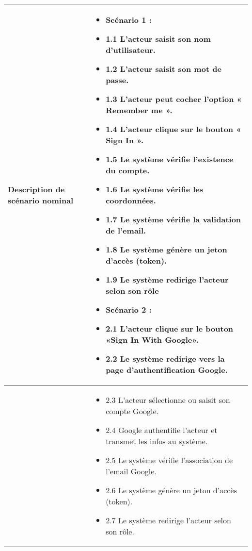 \begin{longtable}{|>{\arraybackslash}p{4.2cm}|>{\arraybackslash}p{12.5cm}|}
\textbf{Description de scénario nominal} &
\begin{itemize}[label=]
  \item \textbf{Scénario 1 :}
    \item 1.1 L'acteur saisit son nom d'utilisateur.
    \item 1.2 L'acteur saisit son mot de passe.
    \item 1.3 L'acteur peut cocher l'option « Remember me ».
    \item 1.4 L'acteur clique sur le bouton « Sign In ».
    \item 1.5 Le système vérifie l'existence du compte.
    \item 1.6 Le système vérifie les coordonnées.
    \item 1.7 Le système vérifie la validation de l'email.
    \item 1.8 Le système génère un jeton d'accès (token).
    \item 1.9 Le système redirige l'acteur selon son rôle
  \item \textbf{Scénario 2 :}
        \item 2.1 L'acteur clique sur le bouton «Sign In With Google».
\item 2.2 Le système redirige vers la page d'authentification Google.
\end{itemize} \\
\hline



\textbf{} &
\begin{itemize}

    \item 2.3 L'acteur sélectionne ou saisit son compte Google.
    \item 2.4 Google authentifie l'acteur et transmet les infos au système.
    \item 2.5 Le système vérifie l'association de l'email Google.
    \item 2.6 Le système génère un jeton d'accès (token).
    \item 2.7 Le système redirige l'acteur selon son rôle.
\end{itemize} \\
\hline






\end{longtable}
